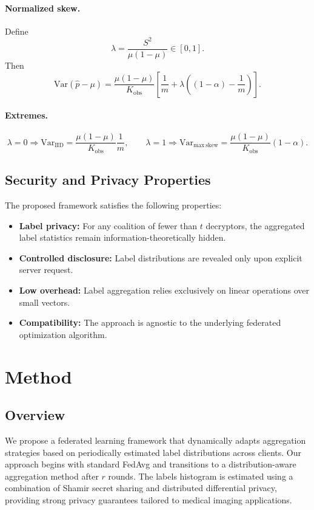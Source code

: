 \documentclass[runningheads]{llncs}
\begin{document}
\paragraph{Normalized skew.}
Define
\[
\lambda = \frac{S^2}{\mu(1-\mu)} \in [0,1].
\]
Then
\[
\boxed{
\mathrm{Var}(\hat p-\mu)
=
\frac{\mu(1-\mu)}{K_{\mathrm{obs}}}
\left[
\frac{1}{m}
+
\lambda\!\left((1-\alpha)-\frac{1}{m}\right)
\right].
}
\]

\paragraph{Extremes.}
\[
\lambda=0 \Rightarrow 
\mathrm{Var}_{\mathrm{IID}}
=
\frac{\mu(1-\mu)}{K_{\mathrm{obs}}}\frac{1}{m},
\qquad
\lambda=1 \Rightarrow 
\mathrm{Var}_{\mathrm{max\ skew}}
=
\frac{\mu(1-\mu)}{K_{\mathrm{obs}}}(1-\alpha).
\]



\subsection{Security and Privacy Properties}

The proposed framework satisfies the following properties:

\begin{itemize}
    \item \textbf{Label privacy:}
    For any coalition of fewer than $t$ decryptors, the aggregated label statistics remain
    information-theoretically hidden.
    \item \textbf{Controlled disclosure:}
    Label distributions are revealed only upon explicit server request.
    \item \textbf{Low overhead:}
    Label aggregation relies exclusively on linear operations over small vectors.
    \item \textbf{Compatibility:}
    The approach is agnostic to the underlying federated optimization algorithm.
\end{itemize}


\section{Method}

\subsection{Overview}

We propose a federated learning framework that dynamically adapts aggregation strategies based on periodically estimated label distributions across clients. Our approach begins with standard FedAvg and transitions to a distribution-aware aggregation method after $r$ rounds. The labels histogram is estimated using a combination of Shamir secret sharing and distributed differential privacy, providing strong privacy guarantees tailored to medical imaging applications.
\end{document}
